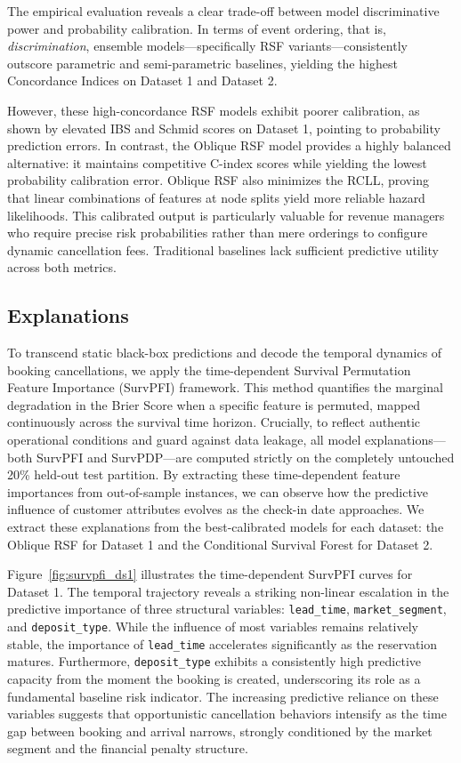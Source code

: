 \documentclass[pdflatex,sn-mathphys-ay]{sn-jnl}%
\theoremstyle{thmstyleone}%
\theoremstyle{thmstyletwo}%
\theoremstyle{thmstylethree}%
\begin{document}
The empirical evaluation reveals a clear trade-off between model discriminative power and probability calibration. In terms of event ordering, that is, \textit{discrimination}, ensemble models—specifically RSF variants—consistently outscore parametric and semi-parametric baselines, yielding the highest Concordance Indices on Dataset 1 and Dataset 2. 

However, these high-concordance RSF models exhibit poorer calibration, as shown by elevated IBS and Schmid scores on Dataset 1, pointing to probability prediction errors. In contrast, the Oblique RSF model provides a highly balanced alternative: it maintains competitive C-index scores while yielding the lowest probability calibration error. Oblique RSF also minimizes the RCLL, proving that linear combinations of features at node splits yield more reliable hazard likelihoods. This calibrated output is particularly valuable for revenue managers who require precise risk probabilities rather than mere orderings to configure dynamic cancellation fees. Traditional baselines lack sufficient predictive utility across both metrics.

\subsection{Explanations}
\label{sec:explanations}

To transcend static black-box predictions and decode the temporal dynamics of booking cancellations, we apply the time-dependent Survival Permutation Feature Importance (SurvPFI) framework. This method quantifies the marginal degradation in the Brier Score when a specific feature is permuted, mapped continuously across the survival time horizon. Crucially, to reflect authentic operational conditions and guard against data leakage, all model explanations—both SurvPFI and SurvPDP—are computed strictly on the completely untouched 20\% held-out test partition. By extracting these time-dependent feature importances from out-of-sample instances, we can observe how the predictive influence of customer attributes evolves as the check-in date approaches. We extract these explanations from the best-calibrated models for each dataset: the Oblique RSF for Dataset 1 and the Conditional Survival Forest for Dataset 2.

Figure~\ref{fig:survpfi_ds1} illustrates the time-dependent SurvPFI curves for Dataset 1. The temporal trajectory reveals a striking non-linear escalation in the predictive importance of three structural variables: \texttt{lead\_time}, \texttt{market\_segment}, and \texttt{deposit\_type}. While the influence of most variables remains relatively stable, the importance of \texttt{lead\_time} accelerates significantly as the reservation matures. Furthermore, \texttt{deposit\_type} exhibits a consistently high predictive capacity from the moment the booking is created, underscoring its role as a fundamental baseline risk indicator. The increasing predictive reliance on these variables suggests that opportunistic cancellation behaviors intensify as the time gap between booking and arrival narrows, strongly conditioned by the market segment and the financial penalty structure.
\end{document}
